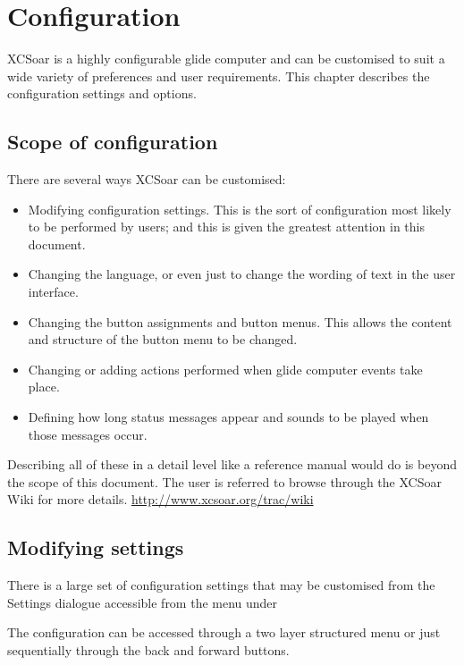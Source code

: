 \chapter{Configuration}\label{cha:configuration}
XCSoar is a highly configurable glide computer and can be customised
to suit a wide variety of preferences and user requirements.  This
chapter describes the configuration settings and options.

\section{Scope of configuration}

There are several ways XCSoar can be customised:
\begin{itemize}

\item Modifying configuration settings.  This is the sort of configuration
 most likely to be performed by users; and this is given the greatest attention in this document.
\item Changing the language, or even just to change the wording
  of text in the user interface.
\item Changing the button assignments and button menus.  This allows 
the content and structure of the button menu to be changed. 
\item Changing or adding actions performed when glide computer events
 take place.
\item Defining how long status messages appear and sounds to be played
 when those messages occur.
\end{itemize}
Describing all of these in a detail level like a reference manual would 
do is beyond the scope of this document. The user is referred to browse 
through the XCSoar Wiki for more details. 
\url{http://www.xcsoar.org/trac/wiki}

\section{Modifying settings}

There is a large set of configuration settings that may be customised
from the Settings dialogue accessible from the menu under
\begin{quote}
\blink{}\blink{}
\end{quote}
The configuration can be accessed through a two layer structured menu 
or just sequentially through the back and forward buttons.

